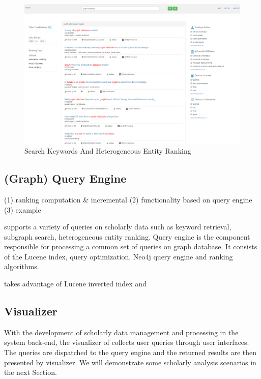 \begin{figure}[tp]
\centering
\includegraphics[width=\textwidth]{searchKeywords.pdf}
\caption{Search Keywords And Heterogeneous Entity Ranking}
\label{fig: search keywords}
\vspace{-3ex}
\end{figure}

\subsection{(Graph) Query Engine}

(1) ranking computation \& incremental
(2) functionality based on query engine
(3) example

\oursystem supports a variety of queries on scholarly data such as keyword retrieval, subgraph search, heterogeneous entity ranking. Query engine is the component responsible for processing a common set of queries on graph database. It consists of the Lucene index, query optimization, Neo4j query engine and ranking algorithms.

\oursystem takes advantage of Lucene inverted index and 


\subsection{Visualizer}
With the development of scholarly data management and processing in the system back-end, the visualizer of \oursystem collects user queries through user interfaces. The queries are dispatched to the query engine and the returned results are then presented by visualizer.
We will demonstrate some scholarly analysis scenarios in the next Section.

